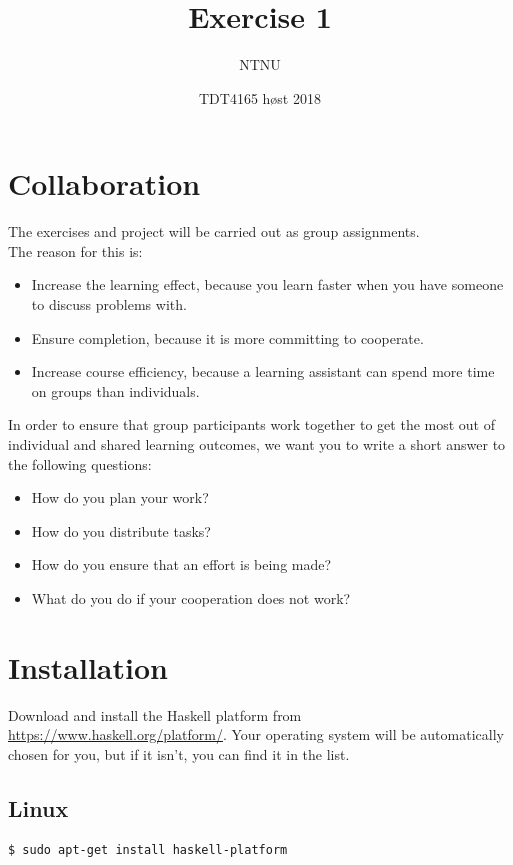 \documentclass{article}
\title{Exercise 1}
\author{NTNU}
\date{TDT4165 høst 2018}
\begin{document}
\maketitle

\section{Collaboration}
The exercises and project will be carried out as group assignments.\\
The reason for this is:
\begin{itemize}
    \item Increase the learning effect, because you learn faster when you have someone to discuss problems with.
    \item Ensure completion, because it is more committing to cooperate.
    \item Increase course efficiency, because a learning assistant can spend more time on groups than individuals.
\end{itemize}
In order to ensure that group participants work together to get the most out of individual and shared learning outcomes, we want you to write a short answer to the following questions:
\begin{itemize}
    \item How do you plan your work?
    \item How do you distribute tasks?
    \item How do you ensure that an effort is being made?
    \item What do you do if your cooperation does not work?
\end{itemize}

\section{Installation}
Download and install the Haskell platform from \url{https://www.haskell.org/platform/}. Your operating system will be automatically chosen for you, but if it isn't, you can find it in the list.
\subsection{Linux}
\paragraph{}
\begin{lstlisting}[language=bash]
  $ sudo apt-get install haskell-platform
\end{lstlisting}
\end{document}

